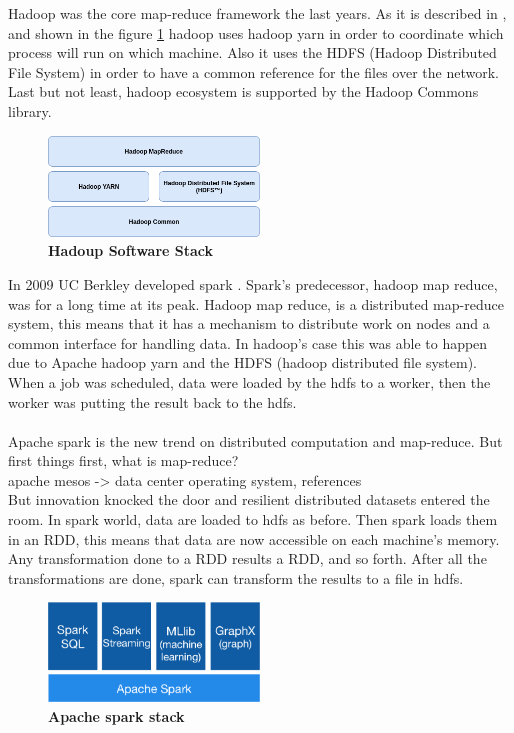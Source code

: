 Hadoop was the core map-reduce framework the last years.
As it is described in \cite{Hadoop:9}, and shown in the figure \ref{hadoopStack} hadoop uses hadoop yarn in order to coordinate which process will run on which machine. Also it uses the HDFS (Hadoop Distributed File System) in order to have a common reference for the files over the network. Last but not least, hadoop ecosystem is supported by the Hadoop Commons library. 

\begin{figure}[h]
	\centering
	\includegraphics[width=0.5\textwidth]{images/hadoop-stack.png}
	\caption{\bfseries Hadoup Software Stack}
	\label{hadoopStack}
\end{figure}

 In 2009 UC Berkley developed spark \cite{DatabricsSpark:8}.
Spark's predecessor, hadoop map reduce, was for a long time at its peak. Hadoop map reduce, is a distributed map-reduce system, this means that it has a mechanism to distribute work on nodes and a common interface for handling data. In hadoop's case this was able to happen due to Apache hadoop yarn and the HDFS (hadoop distributed file system). When a job was scheduled, data were loaded by the hdfs to a worker, then the worker was putting the result back to the hdfs. 

\paragraph{}Apache spark is the new trend on distributed computation and map-reduce. 
But first things first, what is map-reduce? \\
apache mesos -> data center operating system, references
\\
But innovation knocked the door and resilient distributed datasets entered the room. In spark world, data are loaded to hdfs as before. Then spark loads them in an RDD, this means that data are now accessible on each machine's memory. Any transformation done to a RDD results a RDD, and so forth. After all the transformations are done, spark can transform the results to a file in hdfs.

\begin{figure}[ht]
  \centering
    \includegraphics[width=0.5\textwidth]{images/spark-stack.png}
    \caption{\bfseries Apache spark stack \cite{ApacheSpark:1}}
   \label{apacheSparkStack}
\end{figure}

